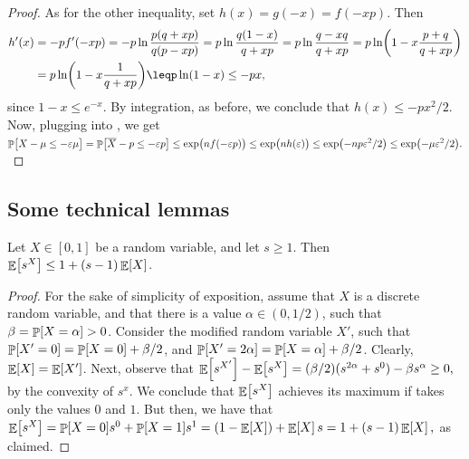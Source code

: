 \begin{proof}
    As for the other inequality, set $h(x) = g(-x) = f(-xp)$. Then
    \begin{align*}
        h'(x)%
        &=%
        -p f'(-xp)%
        =%
        -p\ln \frac{p(q+xp)}{q(p-xp)} %
        =%
        p\ln \frac{q(1-x)}{q+xp} %
        =%
        p\ln \frac{q-xq}{q+xp} %
        =%
        p\ln\pth{ 1 - x\frac{p+q}{q+xp}} %
        \\&%
        =%
        p\ln\pth{ 1 - x\frac{1}{q+xp}} %
        \leq%
        p\ln\pth{ 1 - x} %
        \leq%
        -p x,
    \end{align*}
    since $1-x \leq e^{-x}$.  By integration, as before, we conclude
    that $h(x) \leq -p x^2/2$.  Now, plugging into ,
    we get
    \begin{math}%
        \ds%
        \Prob{\bigl.{X} - \mu \leq -\eps \mu }%
        =%
        \Prob{\bigl.\overline{X} - p \leq -\eps p }%
        \leq%
        \exp\pth{ \bigl. n f(-\eps p)}%
        \leq%
        \exp\pth{ \bigl. n h(\eps )}%
        \leq%
        \exp\pth{ \bigl. -n p \eps^2/2}%
        \leq%
        \exp\pth{ \bigl. - \mu \eps^2/2}.
    \end{math}
\end{proof}

\subsection{Some technical lemmas}

\begin{lemma}
    Let $X \in [0,1]$ be a random variable, and let $s \geq 1$. Then
    $\mathop{\mathbb{E}}\!\left[ {s^X} \right] \leq 1 + (s-1)\mathop{\mathbb{E}}\!\left[ {X} \right]$.
\end{lemma}
\begin{proof}
    For the sake of simplicity of exposition, assume that $X$ is a
    discrete random variable, and that there is a value
    $\alpha \in (0,1/2)$, such that $\beta = \Prob{X = \alpha } > 0
    $.
    Consider the modified random variable $X'$, such that
    $\Prob{ X' = 0 } = \Prob{X = 0} + \beta/2$, and
    $\Prob{X' = 2\alpha } = \Prob{X = \alpha } + \beta/2$. Clearly,
    $\mathop{\mathbb{E}}\!\left[ {X} \right] = \mathop{\mathbb{E}}\!\left[ {X'} \right]$. Next, observe that
    \begin{math}
        \Ex{s^{X'}} - \Ex{s^X}%
        =%
        (\beta/2)( s^{2\alpha} + s^{0}) - \beta s^{\alpha} \geq 0,
    \end{math}
    by the convexity of $s^x$. We conclude that $ \mathop{\mathbb{E}}\!\left[ {s^X} \right]$ achieves
    its maximum if takes only the values $0$ and $1$. But then, we
    have that
    \begin{math}
        \Ex{s^X}%
        =%
        \Prob{X=0}s^0 + \Prob{X=1}s^1%
        =%
        (1-\Ex{X}) + \Ex{X} s %
        =%
        1 + ( s-1)\Ex{X},
    \end{math}
    as claimed.
\end{proof}




